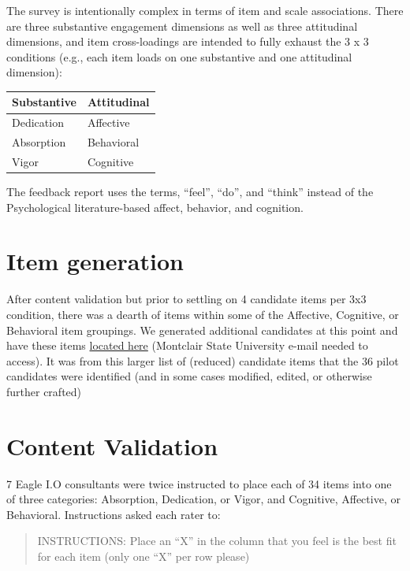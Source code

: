\documentclass[
]{book}
\begin{document}
The survey is intentionally complex in terms of item and scale associations. There are three substantive engagement dimensions as well as three attitudinal dimensions, and item cross-loadings are intended to fully exhaust the 3 x 3 conditions (e.g., each item loads on one substantive and one attitudinal dimension):

\begin{longtable}[]{@{}ll@{}}
\toprule
Substantive & Attitudinal \\
\midrule
\endhead
Dedication & Affective \\
Absorption & Behavioral \\
Vigor & Cognitive \\
\bottomrule
\end{longtable}

The feedback report uses the terms, ``feel'', ``do'', and ``think'' instead of the Psychological literature-based affect, behavior, and cognition.

\hypertarget{item-generation}{%
\section{Item generation}\label{item-generation}}

After content validation but prior to settling on 4 candidate items per 3x3 condition, there was a dearth of items within some of the Affective, Cognitive, or Behavioral item groupings. We generated additional candidates at this point and have these items \href{https://docs.google.com/document/d/1whB4Ve4aDDl3bxx3dIlloouTDy1ScCcxrT3gK6s9DyU/edit?usp=sharing}{located here} (Montclair State University e-mail needed to access). It was from this larger list of (reduced) candidate items that the 36 pilot candidates were identified (and in some cases modified, edited, or otherwise further crafted)

\hypertarget{CValid}{%
\section{Content Validation}\label{CValid}}

7 Eagle I.O consultants were twice instructed to place each of 34 items into one of three categories: Absorption, Dedication, or Vigor, and Cognitive, Affective, or Behavioral. Instructions asked each rater to:

\begin{quote}
INSTRUCTIONS: Place an ``X'' in the column that you feel is the best fit for each item (only one ``X'' per row please)
\end{quote}
\end{document}
